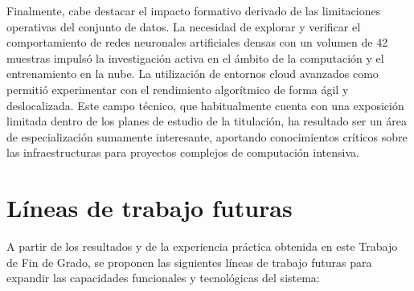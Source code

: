 Finalmente, cabe destacar el impacto formativo derivado de las limitaciones operativas del conjunto de datos. La necesidad de explorar y verificar el comportamiento de redes neuronales artificiales densas con un volumen de 42 muestras impulsó la investigación activa en el ámbito de la computación y el entrenamiento en la nube. La utilización de entornos cloud avanzados como  permitió experimentar con el rendimiento algorítmico de forma ágil y deslocalizada. Este campo técnico, que habitualmente cuenta con una exposición limitada dentro de los planes de estudio de la titulación, ha resultado ser un área de especialización sumamente interesante, aportando conocimientos críticos sobre las  infraestructuras para proyectos complejos de computación intensiva.

\section{Líneas de trabajo futuras}

A partir de los resultados y de la experiencia práctica obtenida en este Trabajo de Fin de Grado, se proponen las siguientes líneas de trabajo futuras para expandir las capacidades funcionales y tecnológicas del sistema:

